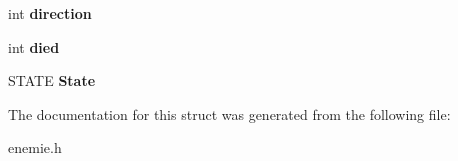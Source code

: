 \begin{DoxyCompactItemize}
\item 
int {\bfseries direction}\hypertarget{structennemi_aa1f57a616910ffd5799f1097a3160e0b}{}\label{structennemi_aa1f57a616910ffd5799f1097a3160e0b}

\item 
int {\bfseries died}\hypertarget{structennemi_a63264d7ff119c60ac22954a7129cb79e}{}\label{structennemi_a63264d7ff119c60ac22954a7129cb79e}

\item 
S\+T\+A\+TE {\bfseries State}\hypertarget{structennemi_a61282872eaede3d05da5bdbcc3471483}{}\label{structennemi_a61282872eaede3d05da5bdbcc3471483}

\end{DoxyCompactItemize}


The documentation for this struct was generated from the following file\+:\begin{DoxyCompactItemize}
\item 
enemie.\+h\end{DoxyCompactItemize}
